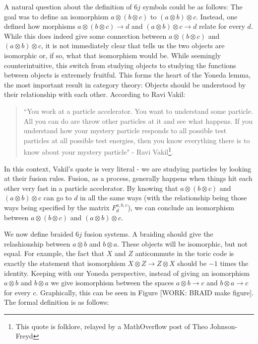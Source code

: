 \documentclass{article}
\theoremstyle{definition}
\numberwithin{figure}{section}
\begin{document}
\begin{enumerate}[\thesection .1.]
A natural question about the definition of $6j$ symbols could be as follows: The goal was to define an isomorphism $a\otimes (b\otimes c)$ to $(a\otimes b)\otimes c$. Instead, one defined how morphisms $a\otimes (b\otimes c)\to d$
 and $(a\otimes b)\otimes c\to d$ relate for every $d$. While this does indeed give some connection between $a\otimes (b\otimes c)$ and $(a\otimes b)\otimes c$, it is not immediately clear that tells us the two objects are isomorphic or, if so, what that isomorphism would be. While seemingly counterintuitive, this switch from studying objects to studying the functions between objects is extremely fruitful. This forms the heart of the Yoneda lemma, the most important result in category theory: Objects should be understood by their relationship with each other. According to Ravi Vakil:

\begin{quote}
``You work at a particle accelerator. You want to understand some particle. All you can do are throw other particles at it and see what happens. If you understand how your mystery particle responds to all possible test particles at all possible test energies, then you know everything there is to know about your mystery particle" - Ravi Vakil\footnote{This quote is folklore, relayed by a MathOverflow post of Theo Johnson-Freyd}.
\end{quote}

In this context, Vakil's quote is very literal - we are studying particles by looking at their fusion rules. Fusion, as a process, generally happens when things hit each other very fast in a particle accelerator. By knowing that $a\otimes (b\otimes c)$ and $(a\otimes b)\otimes c$ can go to $d$ in all the same ways (with the relationship being those ways being specified by the matrix $F^{a,b,c}_d$), we can conclude an isomorphism between $a\otimes (b\otimes c)$ and $(a\otimes b)\otimes c$.

We now define braided $6j$ fusion systems. A braiding should give the relashionship between $a\otimes b$ and $b\otimes a$. These objects will be isomorphic, but not equal. For example, the fact that $X$ and $Z$ anticommute in the toric code is exactly the statement that isomorphism $X\otimes Z\to Z\otimes X$ should be $-1$ times the identity. Keeping with our Yoneda perspective, instead of giving an isomorphism $a\otimes b$ and $b\otimes a$ we give isomorphism between the spaces $a\otimes b\to c$ and $b\otimes a\to c$ for every $c$. Graphically, this can be seen in Figure [WORK: BRAID make figure]. The formal definition is as follows:


\end{enumerate}
\end{document}
